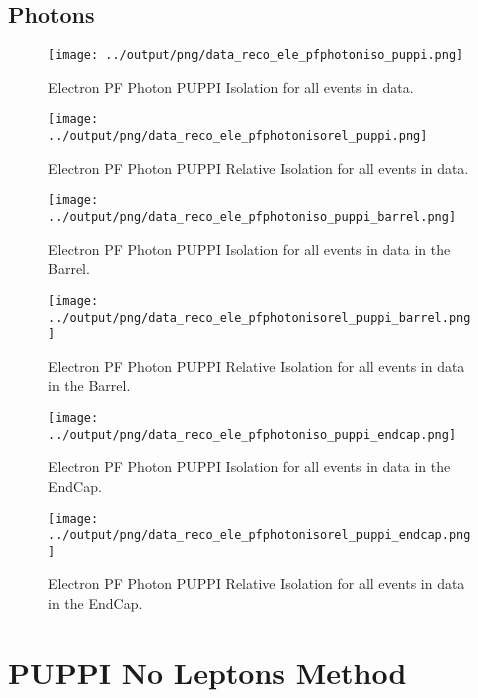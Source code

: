 \documentclass[11pt]{book}
\begin{document}
\subsection{Photons}
\begin{figure}[htb]
\centering
\texttt{[image: ../output/png/data\_reco\_ele\_pfphotoniso\_puppi.png]}
\caption{Electron PF Photon PUPPI Isolation for all events in data.}
\label{fig:data_ele_pfphotoniso_puppi}
\end{figure}

\begin{figure}[htb]
\centering
\texttt{[image: ../output/png/data\_reco\_ele\_pfphotonisorel\_puppi.png]}
\caption{Electron PF Photon PUPPI Relative Isolation for all events in data.}
\label{fig:data_ele_pfphotonisorel_puppi}
\end{figure}

\begin{figure}[htb]
\centering
\texttt{[image: ../output/png/data\_reco\_ele\_pfphotoniso\_puppi\_barrel.png]}
\caption{Electron PF Photon PUPPI Isolation for all events in data in the Barrel.}
\label{fig:data_ele_pfphotoniso_puppi_barrel}
\end{figure}

\begin{figure}[htb]
\centering
\texttt{[image: ../output/png/data\_reco\_ele\_pfphotonisorel\_puppi\_barrel.png]}
\caption{Electron PF Photon PUPPI Relative Isolation for all events in data in the Barrel.}
\label{fig:data_ele_pfphotonisorel_puppi_barrel}
\end{figure}

\begin{figure}[htb]
\centering
\texttt{[image: ../output/png/data\_reco\_ele\_pfphotoniso\_puppi\_endcap.png]}
\caption{Electron PF Photon PUPPI Isolation for all events in data in the EndCap.}
\label{fig:data_ele_pfphotoniso_puppi_endcap}
\end{figure}

\begin{figure}[htb]
\centering
\texttt{[image: ../output/png/data\_reco\_ele\_pfphotonisorel\_puppi\_endcap.png]}
\caption{Electron PF Photon PUPPI Relative Isolation for all events in data in the EndCap.}
\label{fig:data_ele_pfphotonisorel_puppi_endcap}
\end{figure}
\clearpage

\section{PUPPI No Leptons Method}
\end{document}
